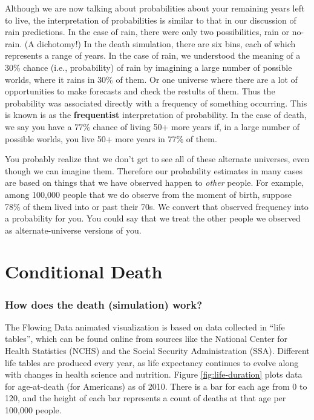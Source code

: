 \documentclass[
  openany]{book}
\begin{document}
Although we are now talking about probabilities about your remaining years left to live, the interpretation of probabilities is similar to that in our discussion of rain predictions. In the case of rain, there were only two possibilities, rain or no-rain. (A dichotomy!) In the death simulation, there are six bins, each of which represents a range of years. In the case of rain, we understood the meaning of a 30\% chance (i.e., probability) of rain by imagining a large number of possible worlds, where it rains in 30\% of them. Or one universe where there are a lot of opportunities to make forecasts and check the restults of them. Thus the probability was associated directly with a frequency of something occurring. This is known is as the \textbf{frequentist} interpretation of probability. In the case of death, we say you have a 77\% chance of living 50+ more years if, in a large number of possible worlds, you live 50+ more years in 77\% of them.

You probably realize that we don't get to see all of these alternate universes, even though we can imagine them. Therefore our probability estimates in many cases are based on things that we have observed happen to \emph{other} people. For example, among 100,000 people that we do observe from the moment of birth, suppose 78\% of them lived into or past their 70s. We convert that observed frequency into a probability for you. You could say that we treat the other people we observed as alternate-universe versions of you.

\hypertarget{conditional-death}{%
\chapter{Conditional Death}\label{conditional-death}}

\hypertarget{how-does-the-death-simulation-work}{%
\subsection*{How does the death (simulation) work?}\label{how-does-the-death-simulation-work}}

The Flowing Data animated visualization is based on data collected in ``life tables'', which can be found online from sources like the National Center for Health Statistics (NCHS) and the Social Security Administration (SSA). Different life tables are produced every year, as life expectancy continues to evolve along with changes in health science and nutrition. Figure \ref{fig:life-duration} plots data for age-at-death (for Americans) as of 2010. There is a bar for each age from 0 to 120, and the height of each bar represents a count of deaths at that age per 100,000 people.
\end{document}
